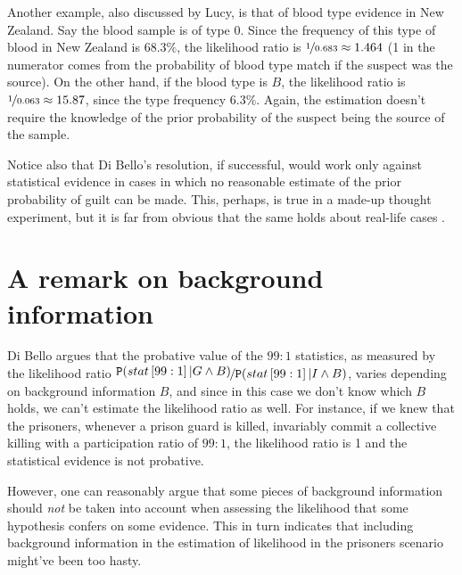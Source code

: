 \documentclass{article}
\newcommand{\pr}[1]{\mbox{$\mathtt{P}(#1)$}}
\begin{document}
 Another example, also discussed by Lucy, is that of blood type  evidence in New Zealand. Say the blood sample is of type 0. Since the frequency of this type of blood in New Zealand is $68.3\%$, the likelihood ratio is $\nicefrac{1}{0.683}\approx 1.464$ (1 in the numerator comes from the probability of blood type match if the suspect was the source). On the other hand, if the blood type is $B$, the likelihood ratio is $\nicefrac{1}{0.063}\approx 15.87$, since the type frequency $6.3\%$. Again, the estimation doesn't require the knowledge of the prior probability of the suspect being the source of the sample. 



Notice also that  Di Bello's resolution, if successful, would work only against statistical evidence in cases in which no reasonable estimate of the prior probability of guilt can be made. This, perhaps, is true in a made-up thought experiment, but it is far from obvious that the same holds about real-life cases \citep[for a recent proposal, see][]{fenton2019OpportunityPriorProofbased}. 


\section{A remark on background information}


 Di Bello argues that the probative value of the $99:1$ statistics, as measured by the likelihood ratio
  $\nicefrac{\pr{stat\left[99:1 \right]  \vert G \wedge B}}{ \pr{stat\left[99:1 \right]  \vert I \wedge B}}$, varies depending on background information $B$, and since in this case we don't know which  $B$ holds, we can't estimate the likelihood ratio as well. For instance,  if we knew that the prisoners, whenever a prison guard is killed, invariably commit a collective killing with a participation ratio of $99:1$, the likelihood ratio is 1 and the statistical evidence is not probative. 

  However, one can reasonably argue that some pieces of background information should \emph{not} be taken into account when assessing the likelihood that some hypothesis confers on some evidence. This in turn indicates that including background information in the estimation of likelihood in the prisoners scenario might've been too hasty.
\end{document}

